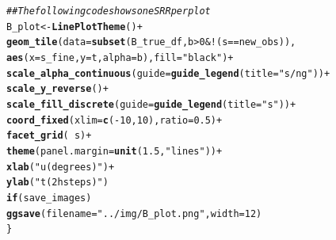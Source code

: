 \documentclass[a4paper,11pt]{article}\usepackage[]{graphicx}\usepackage[]{color}
\makeatletter
\newcommand{\hlnum}[1]{\textcolor[rgb]{0.686,0.059,0.569}{#1}}%
\newcommand{\hlstr}[1]{\textcolor[rgb]{0.192,0.494,0.8}{#1}}%
\newcommand{\hlcom}[1]{\textcolor[rgb]{0.678,0.584,0.686}{\textit{#1}}}%
\newcommand{\hlopt}[1]{\textcolor[rgb]{0,0,0}{#1}}%
\newcommand{\hlstd}[1]{\textcolor[rgb]{0.345,0.345,0.345}{#1}}%
\newcommand{\hlkwa}[1]{\textcolor[rgb]{0.161,0.373,0.58}{\textbf{#1}}}%
\newcommand{\hlkwb}[1]{\textcolor[rgb]{0.69,0.353,0.396}{#1}}%
\newcommand{\hlkwc}[1]{\textcolor[rgb]{0.333,0.667,0.333}{#1}}%
\newcommand{\hlkwd}[1]{\textcolor[rgb]{0.737,0.353,0.396}{\textbf{#1}}}%
\newenvironment{kframe}{%
 \def\at@end@of@kframe{}%
 \ifinner\ifhmode%
  \def\at@end@of@kframe{\end{minipage}}%
  \begin{minipage}{\columnwidth}%
 \fi\fi%
 \def\FrameCommand##1{\hskip\@totalleftmargin \hskip-\fboxsep
 \colorbox{shadecolor}{##1}\hskip-\fboxsep
     \hskip-\linewidth \hskip-\@totalleftmargin \hskip\columnwidth}%
 \MakeFramed {\advance\hsize-\width
   \@totalleftmargin\z@ \linewidth\hsize
   \@setminipage}}%
 {\par\unskip\endMakeFramed%
 \at@end@of@kframe}
\newenvironment{knitrout}{}{} %
\makeatother
\begin{document}
\begin{knitrout}
\begin{kframe}
\begin{alltt}
  \hlcom{## The following code shows one SRR per plot  }
  \hlstd{B_plot} \hlkwb{<-} \hlkwd{LinePlotTheme}\hlstd{()} \hlopt{+}
    \hlkwd{geom_tile}\hlstd{(}\hlkwc{data}\hlstd{=}\hlkwd{subset}\hlstd{(B_true_df,b}\hlopt{>}\hlnum{0} \hlopt{& !}\hlstd{(s}\hlopt{==}\hlstd{new_obs)),}
              \hlkwd{aes}\hlstd{(}\hlkwc{x}\hlstd{=s_fine,}\hlkwc{y}\hlstd{=t,}\hlkwc{alpha}\hlstd{=b),}\hlkwc{fill}\hlstd{=}\hlstr{"black"}\hlstd{)} \hlopt{+}
    \hlkwd{scale_alpha_continuous}\hlstd{(}\hlkwc{guide}\hlstd{=}\hlkwd{guide_legend}\hlstd{(}\hlkwc{title}\hlstd{=}\hlstr{"s/ng"}\hlstd{))} \hlopt{+}
    \hlkwd{scale_y_reverse}\hlstd{()}\hlopt{+}
    \hlkwd{scale_fill_discrete}\hlstd{(}\hlkwc{guide}\hlstd{=}\hlkwd{guide_legend}\hlstd{(}\hlkwc{title}\hlstd{=}\hlstr{"s"}\hlstd{))} \hlopt{+}
    \hlkwd{coord_fixed}\hlstd{(}\hlkwc{xlim}\hlstd{=}\hlkwd{c}\hlstd{(}\hlopt{-}\hlnum{10}\hlstd{,}\hlnum{10}\hlstd{),}\hlkwc{ratio} \hlstd{=} \hlnum{0.5}\hlstd{)}  \hlopt{+}
    \hlkwd{facet_grid}\hlstd{(}\hlopt{~}\hlstd{s)} \hlopt{+}
    \hlkwd{theme}\hlstd{(}\hlkwc{panel.margin} \hlstd{=} \hlkwd{unit}\hlstd{(}\hlnum{1.5}\hlstd{,} \hlstr{"lines"}\hlstd{))} \hlopt{+}
    \hlkwd{xlab}\hlstd{(}\hlstr{"u (degrees)"}\hlstd{)} \hlopt{+}
    \hlkwd{ylab}\hlstd{(}\hlstr{"t (2 h steps)"}\hlstd{)}
  \hlkwa{if}\hlstd{(save_images)}
    \hlkwd{ggsave}\hlstd{(}\hlkwc{filename} \hlstd{=} \hlstr{"../img/B_plot.png"}\hlstd{,}\hlkwc{width}\hlstd{=}\hlnum{12}\hlstd{)}
\hlstd{\}}
\end{alltt}
\end{kframe}
\end{knitrout}
\end{document}
